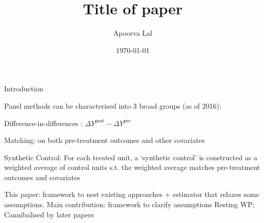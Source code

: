 \documentclass[12pt, aspectratio=169]{beamer}
\begin{document}
\title{Title of paper}
\author{Apoorva Lal}
\date{\today}

\frame{\titlepage}



\begin{frame}{Introduction}


\bi
  \item Panel methods can be characterised into 3 broad groups (as of 2016):
    \bi
      \item Difference-in-differences : $\Delta Y^{\text{post}} - \Delta Y^{\text{pre}}$
      \item Matching: on both pre-treatment outcomes and other covariates
      \item Synthetic Control: For each treated unit, a `synthetic
        control' is constructed as a weighted average of control units
        s.t. the weighted average matches pre-treatment outcomes and
        covariates
    \ei
  \item This paper: framework to nest existing approaches + estimator
  that relaxes some assumptions.
  \bi
    \I Main contribution: framework to clarify assumptions
    \I Resting WP; Cannibalised by later papers
    \I \textcite{Arkhangelsky2020-sz}
  \ei
\ei

\end{frame}
\end{document}
